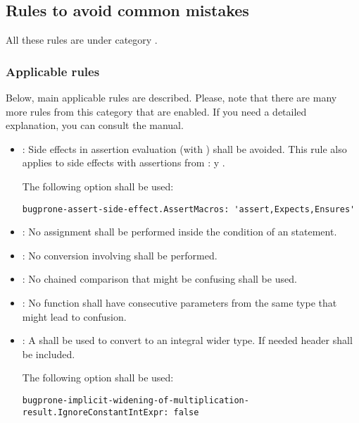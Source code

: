 \subsection{Rules to avoid common mistakes}

All these rules are under category
.

\subsubsection{Applicable rules}

Below, main applicable rules are described.
Please, note that there are many more rules from this category that are enabled.
If you need a detailed explanation, you can consult the  manual. 

\begin{itemize}

\item {}:
Side effects in assertion evaluation (with ) shall be avoided.
This rule also applies to side effects with assertions from :
 y .

The following option shall be used:
\begin{lstlisting}
bugprone-assert-side-effect.AssertMacros: 'assert,Expects,Ensures'
\end{lstlisting}

\item {}:
No assignment shall be performed inside the condition of an  statement.

\item {}:
No conversion involving  shall be performed.

\item {}:
No chained comparison that might be confusing shall be used.

\item {}: 
No function shall have consecutive parameters from the same type that 
might lead to confusion.

\item {}: 
A  shall be used to convert to an integral wider type.
If needed header  shall be included.

The following option shall be used:
\begin{lstlisting}
bugprone-implicit-widening-of-multiplication-result.IgnoreConstantIntExpr: false
\end{lstlisting}


\end{itemize}
